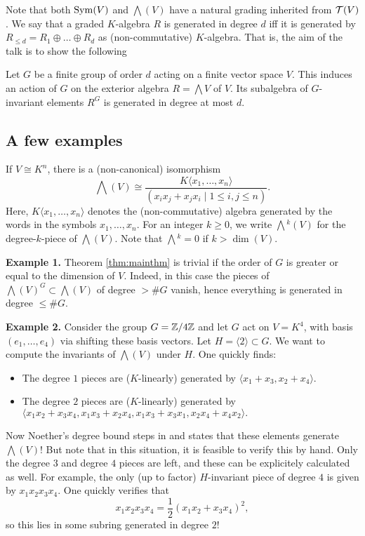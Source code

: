 \documentclass[../main.tex]{subfiles}
\begin{document}
Note that both $\operatorname{Sym}(V)$ and $\bigwedge(V)$ have a natural grading inherited from
$\mathcal{T}(V)$. 
We say that a graded $K$-algebra $R$ is generated in degree $d$ iff it is
generated by $R_{\leq d} = R_1 \oplus \dots \oplus R_d$ as (non-commutative)
$K$-algebra.  That is, the aim of the talk is to show the following 
\begin{thm}\label{thm:mainthm}
    Let $G$ be a finite group of order $d$ acting on a finite vector space $V$.
    This induces an action of $G$ on the exterior algebra $R = \bigwedge V$ of $V$.
    Its subalgebra of $G$-invariant elements $R^G$ is generated in
    degree at most $d$.
\end{thm}

\subsection{A few examples} %
\label{sub:Some examples}
If $V \cong K^n$, there is a (non-canonical) isomorphism
\begin{equation*}
    \bigwedge(V) \cong \frac{K\langle x_1, \dots, x_n \rangle}{(x_i x_j + x_j
    x_i \mid 1 \leq i,j \leq n)}.
\end{equation*}
Here, $K\langle x_1, \dots, x_n \rangle$ denotes the (non-commutative) algebra generated
by the words in the symbols $x_1, \dots, x_n$.
For an integer $k \geq 0$, we write $\bigwedge{}^k(V)$ for the degree-$k$-piece of 
$\bigwedge(V)$. Note that $\bigwedge{}^k = 0$ if $k > \dim(V)$. 

\textbf{Example 1.} Theorem \ref{thm:mainthm} is trivial if the order of $G$ is greater
or equal to the dimension of $V$. Indeed, in this case the pieces of
$\bigwedge(V)^G \subset \bigwedge(V)$ of degree $>\# G$ vanish, hence
everything is generated in degree $\leq \# G$.

\textbf{Example 2.} Consider the group $G = \mathbb{Z}/4\mathbb{Z}$ and let $G$ act on 
$V = K^4$, with basis $(e_1, \dots, e_4)$ via shifting these basis vectors.
Let $H = \langle 2 \rangle \subset G$. We want to compute the invariants of
$\bigwedge(V)$ under $H$. One quickly finds:
\begin{itemize}
    \item The degree $1$ pieces are ($K$-linearly) generated by $\langle x_1 +
        x_3, x_2 + x_4 \rangle$.
    \item The degree $2$ pieces are ($K$-linearly) generated by $\langle x_1
        x_2 + x_3x_4, x_1 x_3 + x_2 x_4, x_1x_3+x_3x_1,  x_2x_4 + x_4x_2
        \rangle.$
\end{itemize}
Now Noether's degree bound steps in and states that these elements generate
$\bigwedge(V)$! But note that in this situation, it is feasible to verify this 
by hand. Only the degree $3$ and degree $4$ pieces are left, and these can be 
explicitely calculated as well. For example, the only (up to factor) 
$H$-invariant piece of degree $4$ is given by $x_1 x_2 x_3 x_4$. One quickly
verifies that 
\begin{equation*}
    x_1 x_2 x_3 x_4 = \frac 12 (x_1 x_2 + x_3 x_4)^2,
\end{equation*}
so this lies in some subring generated in degree $2$!
\end{document}
